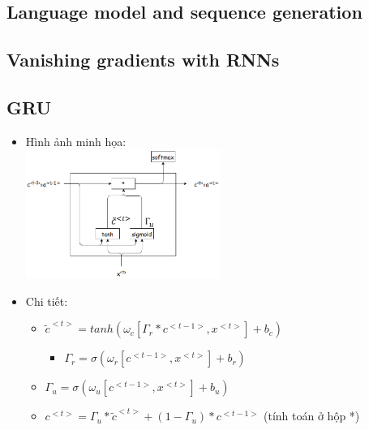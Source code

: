 \documentclass[12pt,a4paper]{report}
\begin{document}
		\subsection{Language model and sequence generation}
		\subsection{Vanishing gradients with RNNs}
		\subsection{GRU}
			\begin{itemize}
				\item Hình ảnh minh họa:\\\includegraphics[width=0.5\textwidth]{GRU}
				\item Chi tiết:
					\begin{itemize}
						\item $\tilde{c}^{<t>}=tanh(\omega_c[\Gamma_r*c^{<t-1>},x^{<t>}]+b_c)$
						\begin{itemize}
												\item $\Gamma_r = \sigma(\omega_r[c^{<t-1>},x^{<t>}]+b_r)$
						\end{itemize}
						\item $\Gamma_u = \sigma(\omega_u[c^{<t-1>},x^{<t>}]+b_u)$
						\item $c^{<t>}=\Gamma_u*\tilde{c}^{<t>} + (1 - \Gamma_u) * c^{<t-1>}$ (tính toán ở hộp *)
					\end{itemize}
			\end{itemize}
\end{document}
